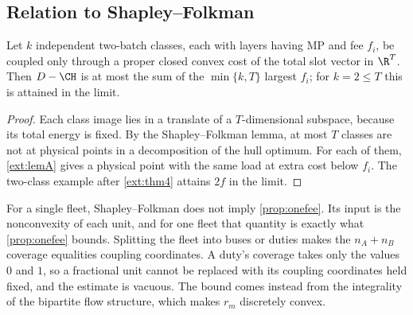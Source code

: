\subsection*{Relation to Shapley--Folkman}

\begin{proposition}\label{ext:sf}
Let $k$ independent two-batch classes, each with layers having MP and fee
$f_i$, be coupled only through a proper closed convex cost of the total slot
vector in $\R^T$. Then $D-\CH$ is at most the sum of the $\min\{k,T\}$ largest
$f_i$; for $k=2\le T$ this is attained in the limit.
\end{proposition}
\begin{proof}
Each class image lies in a translate of a $T$-dimensional subspace, because
its total energy is fixed. By the Shapley--Folkman lemma, at most $T$ classes
are not at physical points in a decomposition of the hull optimum. For each of
them, \cref{ext:lemA} gives a physical point with the same load at extra cost
below $f_i$. The two-class example after \cref{ext:thm4} attains $2f$ in the
limit.
\end{proof}

For a single fleet, Shapley--Folkman does not imply \cref{prop:onefee}. Its
input is the nonconvexity of each unit, and for one fleet that quantity is
exactly what \cref{prop:onefee} bounds. Splitting the fleet into buses or
duties makes the $n_A+n_B$ coverage equalities coupling coordinates. A duty's
coverage takes only the values $0$ and $1$, so a fractional unit cannot be
replaced with its coupling coordinates held fixed, and the estimate is
vacuous. The bound comes instead from the integrality of the bipartite flow
structure, which makes $r_m$ discretely convex.

